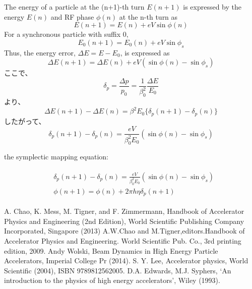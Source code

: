 \documentclass[10pt,a4paper]{ltjsarticle}
\begin{document}
The energy of a particle at the (n+1)-th turn $E(n+1)$ is expressed by the energy $E(n)$ and RF phase $\phi(n)$ at the n-th turn as
%
\begin{equation}
    E(n+1) = E(n) + e V \sin\phi (n)
\end{equation}
%
For a synchronous particle with suffix 0,
%
\begin{equation}
    E_0(n+1) = E_0(n) + e V \sin\phi_s
\end{equation}
%
Thus, the energy error, $\Delta E = E - E_0$, is expressed as
%
\begin{equation}
    \Delta E(n+1) = \Delta E(n) + e V (\sin\phi(n) - \sin\phi_s)
\end{equation}
%
ここで、
%
\begin{equation}
    \delta_p = \frac{\Delta p}{p_0} = \frac{1}{\beta_0^2}\frac{\Delta E}{E_0}
\end{equation}
%
より、
%
\begin{equation}
    \Delta E(n+1) - \Delta E(n) = \beta^2 E_0 \{\delta_p(n+1) - \delta_p(n)\}
\end{equation}
%
したがって、
%
\begin{equation}
    \delta_p(n+1) - \delta_p(n) = \frac{e V}{\beta_0^2 E_0}(\sin\phi(n) -\sin\phi_s)
\end{equation}
%

the symplectic mapping equation:

\begin{align}
    \begin{split}
        &\delta_p(n+1) - \delta_p(n) = \frac{e V}{\beta_0^2 E_0}(\sin\phi(n) -\sin\phi_s) \\
        &\phi(n+1) = \phi(n) + 2\pi h \eta \delta_p(n+1)
    \end{split}
\end{align}
%
\begin{thebibliography}{9}
    A. Chao, K. Mess, M. Tigner, and F. Zimmermann, Handbook of Accelerator Physics and Engineering (2nd Edition), World Scientific Publishing Company Incorporated, Singapore (2013)
    A.W.Chao and M.Tigner,editors.Handbook of Accelerator Physics and Engineering. World Scientific Pub. Co., 3rd printing edition, 2009.
    Andy Wolski, Beam Dynamics in High Energy Particle Accelerators,  Imperial College Pr (2014).
    S. Y. Lee, Accelerator physics, World Scientific (2004), ISBN 9789812562005.
    D.A. Edwards, M.J. Syphers, `An introduction to the physics of high energy accelerators', Wiley (1993).
\end{thebibliography}
%
\end{document}
